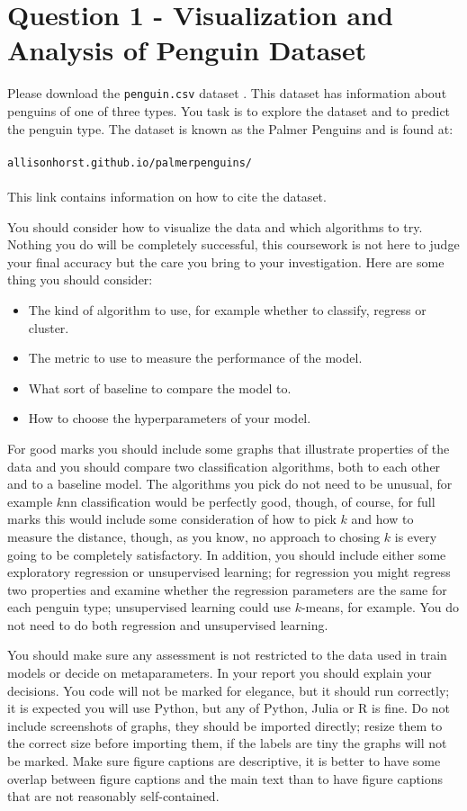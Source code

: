 \documentclass[12pt]{article}
\begin{document}
\section*{Question 1 - Visualization and Analysis of Penguin Dataset}

Please download the \texttt{penguin.csv} dataset \cite{PM}. This dataset has
information about penguins of one of three types. You task is to
explore the dataset and to predict the penguin type. The dataset is
known as the Palmer Penguins and is found at:\\
\\
\texttt{allisonhorst.github.io/palmerpenguins/}\\
\\
This link contains information on how to cite the dataset.

You should consider how to visualize the data and which algorithms to
try. Nothing you do will be completely successful, this coursework is
not here to judge your final accuracy but the care you bring to your
investigation. Here are some thing you should consider:
\begin{itemize}
  \item The kind of algorithm to use, for example whether to classify, regress  or cluster.
  \item The metric to use to measure the performance of the model.
  \item What sort of baseline to compare the model to.
  \item How to choose the hyperparameters of your model.
\end{itemize}
For good marks you should include some graphs that illustrate
properties of the data and you should compare two classification
algorithms, both to each other and to a baseline model. The algorithms
you pick do not need to be unusual, for example $k$nn classification
would be perfectly good, though, of course, for full marks this would
include some consideration of how to pick $k$ and how to measure the
distance, though, as you know, no approach to chosing $k$ is every
going to be completely satisfactory. In addition, you should include
either some exploratory regression or unsupervised learning; for
regression you might regress two properties and examine whether the
regression parameters are the same for each penguin type; unsupervised
learning could use $k$-means, for example. You do not need to do both
regression and unsupervised learning.

You should make sure any assessment is not restricted to the data used
in train models or decide on metaparameters. In your report you should
explain your decisions. You code will not be marked for elegance, but
it should run correctly; it is expected you will use Python, but any
of Python, Julia or R is fine. Do not include screenshots of graphs,
they should be imported directly; resize them to the correct size
before importing them, if the labels are tiny the graphs will not be
marked. Make sure figure captions are descriptive, it is better to
have some overlap between figure captions and the main text than to
have figure captions that are not reasonably self-contained.
\end{document}

